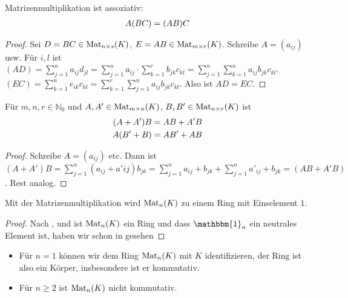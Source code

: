 \begin{lemma}
	Matrizenmultiplikation ist assoziativ:
	\begin{align}
		A(BC)=(AB)C\notag
	\end{align}
\end{lemma}
\begin{proof}
	Sei $D=BC\in \operatorname{Mat}_{n\times s}(K)$, $E=AB \in \operatorname{Mat}_{m\times r}(K)$. Schreibe $A=(a_{ij})$ usw. Für $i,l$ ist $(AD)=
	\sum_{j=1}^n a_{ij}d_{jl}=\sum_{j=1}^n a_{ij}\cdot \sum_{k=1}^r b_{jk}c_{kl}=\sum
	_{j=1}^n \sum_{k=1}^n a_{ij}b_{jk}c_{kl}$. \\
	$(EC)=\sum_{k=1}^n e_{ik}c_{kl}=\sum_{k=1}^r \sum_{j=1}^n a_{ij}b_{jk}c_{kl}$. Also ist 
	$AD=EC$.
\end{proof}

\begin{lemma}
	Für $m,n,r\in \mathbb N_0$ und $A,A'\in \operatorname{Mat}_{m\times n}(K)$, $B,B'\in \operatorname{Mat}_{n\times r}(K)$ ist
	 \begin{align}
	 	(A+A')B&=AB+A'B\notag \\
	 	A(B'+B)&=AB'+AB\notag
	 \end{align}
\end{lemma}
\begin{proof}
	Schreibe $A=(a_{ij})$ etc. Dann ist $(A+A')B=\sum_{j=1}^n (a_{ij}+a'{ij})b_{jk}=\sum_{j=1}^n 
	a_{ij}+b_{jk} + \sum_{j=1}^n a'_{ij}+b_{jk}=(AB+A'B)$. Rest analog.
\end{proof}

\begin{proposition}
	Mit der Matrizenmultiplikation wird $\operatorname{Mat}_n(K)$ zu einem Ring mit Einselement $1$.
\end{proposition}
\begin{proof}
	Nach ,  und  ist $\operatorname{Mat}_n(K)$ ein Ring und dass $\mathbbm{1}_n$ ein neutrales Element ist, haben wir schon in  gesehen
\end{proof}

\begin{example}
	\begin{itemize}
		\item Für $n=1$ können wir dem Ring $\operatorname{Mat}_n(K)$ mit $K$ identifizieren, der Ring ist also ein Körper, 
		insbesondere ist er kommutativ.
		\item Für $n\ge 2$ ist $\operatorname{Mat}_n(K)$ nicht kommutativ.
	\end{itemize}
\end{example}

